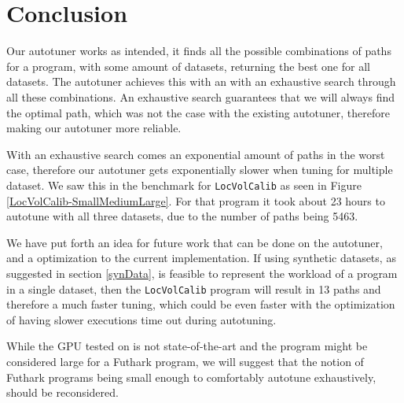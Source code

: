 \section{Conclusion}
Our autotuner works as intended, it finds all the possible combinations of paths for a program, with some amount of datasets, returning the best one for all datasets. The autotuner achieves this with an with an exhaustive search through all these combinations. An exhaustive search guarantees that we will always find the optimal path, which was not the case with the existing autotuner, therefore making our autotuner more reliable.

With an exhaustive search comes an exponential amount of paths in the worst case, therefore our autotuner gets exponentially slower when tuning for multiple dataset. We saw this in the benchmark for \texttt{LocVolCalib} as seen in Figure \ref{LocVolCalib-SmallMediumLarge}. For that program it took about 23 hours to autotune with all three datasets, due to the number of paths being 5463. 

We have put forth an idea for future work that can be done on the autotuner, and a optimization to the current implementation. If using synthetic datasets, as suggested in section \ref{synData}, is feasible to represent the workload of a program in a single dataset, then the \texttt{LocVolCalib} program will result in 13 paths and therefore a much faster tuning, which could be even faster with the optimization of having slower executions time out during autotuning.

While the GPU tested on is not state-of-the-art and the program might be considered large for a Futhark program, we will suggest that the notion of Futhark programs being small enough to comfortably autotune exhaustively, should be reconsidered. 
